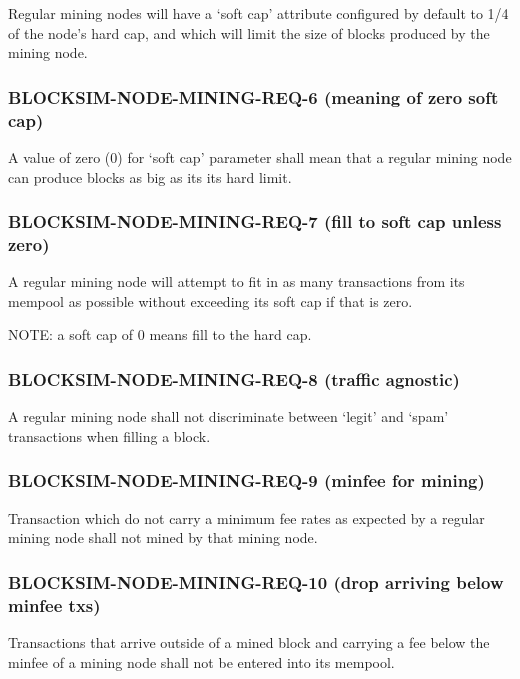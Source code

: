 \documentclass{scrreprt}
\begin{document}
        Regular mining nodes will have a `soft cap' attribute configured by
        default to 1/4 of the node's hard cap, and which will limit the
        size of blocks produced by the mining node.

      \subsubsection{BLOCKSIM-NODE-MINING-REQ-6 (meaning of zero soft cap)}

        A value of zero (0) for `soft cap' parameter shall mean that a regular
        mining node can produce blocks as big as its its hard limit.

      \subsubsection{BLOCKSIM-NODE-MINING-REQ-7 (fill to soft cap unless zero)}

        A regular mining node will attempt to fit in as many transactions
        from its mempool as possible without exceeding its soft cap if
        that is zero.

        NOTE: a soft cap of 0 means fill to the hard cap.

      \subsubsection{BLOCKSIM-NODE-MINING-REQ-8 (traffic agnostic)}

        A regular mining node shall not discriminate between `legit' and `spam'
        transactions when filling a block.

      \subsubsection{BLOCKSIM-NODE-MINING-REQ-9 (minfee for mining)}

        Transaction which do not carry a minimum fee rates as expected by a
        regular mining node shall not mined by that mining node.

      \subsubsection{BLOCKSIM-NODE-MINING-REQ-10 (drop arriving below minfee txs)}

        Transactions that arrive outside of a mined block and carrying a fee
        below the minfee of a mining node shall not be entered into its mempool.
\end{document}
